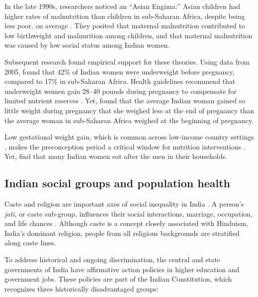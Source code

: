 \documentclass[12pt]{article}
\begin{document}
In the late 1990s, researchers noticed an ``Asian Engima:'' Asian children had higher rates of malnutrition than children in sub-Saharan Africa, despite being less poor, on average \citep{ramalingaswami1996commentary, underwood2002health}.  They posited that maternal malnutrition contributed to low birthweight and malnurition among children, and that maternal malnutrition was caused by low social status among Indian women.  

Subsequent research found empirical support for these theories.  Using data from 2005, \cite{coffey2015prepregnancy} found that 42\% of Indian women were underweight before pregnancy, compared to 17\% in sub-Saharan Africa.  Health guidelines recommend that underweight women gain 28–40 pounds during pregnancy to compensate for limited nutrient reserves \citep{yaktine2010weight, ismail2016gestational}. Yet, \cite{coffey2015prepregnancy} found that the average Indian woman gained so little weight during pregnancy that she weighed less at the end of pregnancy than the average woman in sub-Saharan Africa weighed at the beginning of pregnancy.  

Low gestational weight gain, which is common across low-income country settings \citep{wang2020gestational, perumal2023suboptimal}, makes the preconception period a critical window for nutrition interventions \citep{stephenson2018before}.  Yet, \cite{hathi2021women} find that many Indian women eat after the men in their households.   

\subsection{Indian social groups and population health}

Caste and religion are important axes of social inequality in India \citep{vaid2014caste, majid2015indian}. A person's \textit{jati}, or caste sub-group, influences their social interactions, marriage, occupation, and life chances \citep{deshpande2011grammar, thorat2012blocked}. Although caste is a concept closely associated with Hinduism, India's dominant religion, people from all religious backgrounds are stratified along caste lines. 

To address historical and ongoing discrimination, the central and state governments of India have affirmative action policies in higher education and government jobs. These policies are part of the Indian Constitution, which recognizes three historically disadvantaged groups: 
\end{document}
